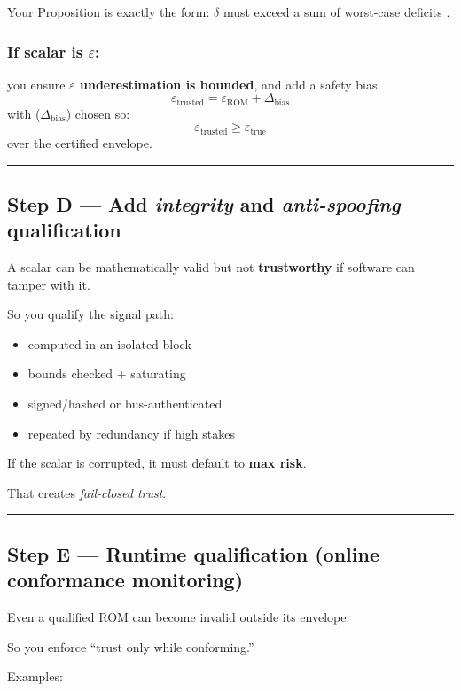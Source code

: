 \documentclass[11pt,a4paper]{article}
\begin{document}
Your Proposition is exactly the form: $\delta$ must exceed a sum of worst-case deficits .

\subsubsection*{If scalar is $\varepsilon$:}

you ensure \textbf{$\varepsilon$ underestimation is bounded}, and add a safety bias:
\[
\varepsilon_{\text{trusted}} = \varepsilon_{\text{ROM}} + \Delta_{\text{bias}}
\]
with ($\Delta_{\text{bias}}$) chosen so:
\[
\varepsilon_{\text{trusted}} \ge \varepsilon_{\text{true}}
\]
over the certified envelope.

\hrule
\vspace{0.75em}

\subsection*{Step D — Add \textit{integrity} and \textit{anti-spoofing} qualification}

A scalar can be mathematically valid but not \textbf{trustworthy} if software can tamper with it.

So you qualify the signal path:

\begin{itemize}
\item computed in an isolated block
\item bounds checked + saturating
\item signed/hashed or bus-authenticated
\item repeated by redundancy if high stakes
\end{itemize}

If the scalar is corrupted, it must default to \textbf{max risk}.

That creates \textit{fail-closed trust}.

\hrule
\vspace{0.75em}

\subsection*{Step E — Runtime qualification (online conformance monitoring)}

Even a qualified ROM can become invalid outside its envelope.

So you enforce ``trust only while conforming.''

Examples:
\end{document}
